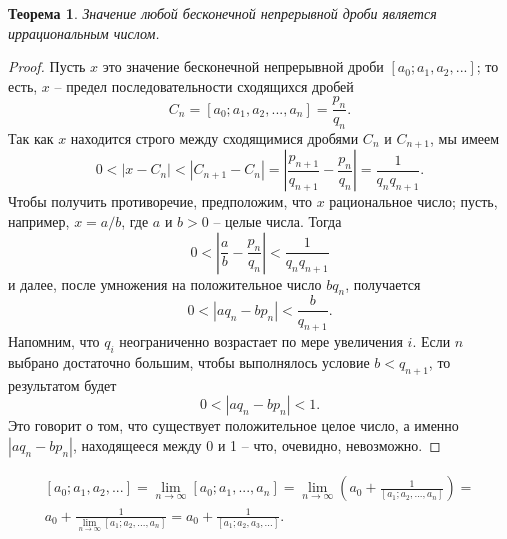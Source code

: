 \documentclass[a4paper,12pt]{article}
\newtheorem{theorem}{Теорема}
\theoremstyle{definition}
\renewcommand{\headrulewidth}{0pt}
\begin{document}
 	\begin{theorem} Значение любой бесконечной непрерывной дроби является иррациональным числом.\end{theorem}
	\begin{proof} Пусть $x$ это значение бесконечной	непрерывной дроби $[a_0; a_1, a_2, ...]$; то есть, $x$ -- предел последовательности сходящихся дробей
	\[C_n=[a_0; a_1, a_2, ..., a_n]=\frac{p_n}{q_n}.\]
	Так как $x$ находится строго между сходящимися дробями $C_n$ и $C_{n+1}$, мы имеем
	\[0<|x-C_n|<|C_{n+1}-C_n|=\left| \frac{p_{n+1}}{q_{n+1}}-\frac{p_n}{q_n} \right|=\frac{1}{q_{n}q_{n+1}}.\]
	Чтобы получить противоречие, предположим, что $x$ рациональное число; пусть, например, $x=a/b$, где $a$ и $b>0$ -- целые числа. Тогда
	 \[0<\left|\frac{a}{b}-\frac{p_n}{q_n}\right|<\frac{1}{q_{n}q_{n+1}}\]
	и далее, после умножения на положительное число $bq_n$, получается
	\[0<|aq_n-bp_n|<\frac{b}{q_{n+1}}.\]
	Напомним, что $q_i$ неограниченно возрастает по мере увеличения $i$. Если $n$ выбрано достаточно большим, чтобы выполнялось условие $b<q_{n+1}$, то	результатом будет
	\[0<|aq_n-bp_n|<1.\]
	Это говорит о том, что существует положительное целое число, а именно	$|aq_n - bp_n|$, находящееся между 0 и 1 -- что, очевидно, невозможно.\end{proof}
	\begin{equation} \begin{split}
	[a_0; a_1, a_2, ...]=\lim_{n\to\infty} [a_0; a_1, ..., a_n]=\lim_{n\to\infty} \left(a_0+\frac{1}{[a_1; a_2, ..., a_n]}\right)=\\a_0+\frac{1}{\lim_{n\to\infty} [ a_1; a_2, ..., a_n]}=a_0+\frac{1}{[a_1; a_2, a_3, ...]}. \end{split} \end{equation}
	\newpage
	\renewcommand{\headrulewidth}{0pt}
	\rhead{\textbf{\thepage}}
	\setcounter{page}{317}
	
\end{document}

